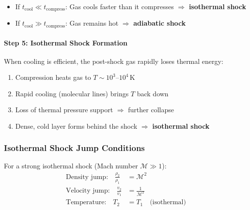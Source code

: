 \documentclass[11pt,a4paper]{article}
\begin{document}
\begin{itemize}
    \item If $t_\mathrm{cool} \ll t_\mathrm{compress}$: Gas cools faster than it compresses
          $\Rightarrow$ \textbf{isothermal shock}
    \item If $t_\mathrm{cool} \gg t_\mathrm{compress}$: Gas remains hot
          $\Rightarrow$ \textbf{adiabatic shock}
\end{itemize}

\paragraph{Step 5: Isothermal Shock Formation}
When cooling is efficient, the post-shock gas rapidly loses thermal energy:
\begin{enumerate}
    \item Compression heats gas to $T \sim 10^3$--$10^4\,\mathrm{K}$
    \item Rapid cooling (molecular lines) brings $T$ back down
    \item Loss of thermal pressure support $\Rightarrow$ further collapse
    \item Dense, cold layer forms behind the shock $\Rightarrow$ \textbf{isothermal shock}
\end{enumerate}

\begin{figure}[h]
\centering
{}
\end{figure}

\subsubsection{Isothermal Shock Jump Conditions}

For a strong isothermal shock (Mach number $\mathcal{M} \gg 1$):
\begin{align}
    \text{Density jump:} \quad \frac{\rho_2}{\rho_1} &= \mathcal{M}^2 \\
    \text{Velocity jump:} \quad \frac{v_2}{v_1} &= \frac{1}{\mathcal{M}^2} \\
    \text{Temperature:} \quad T_2 &= T_1 \quad \text{(isothermal)}
\end{align}
\end{document}
